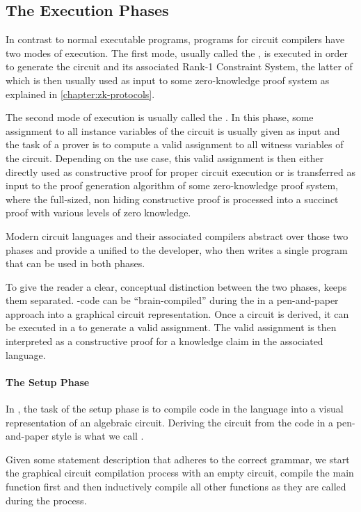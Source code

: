 \subsection{The Execution Phases} In contrast to normal executable programs, programs for circuit compilers have two modes of execution. The first mode, usually called the  , is executed in order to generate the circuit and its associated Rank-1 Constraint System, the latter of which is then usually used as input to some zero-knowledge proof system as explained in \ref{chapter:zk-protocols}.

The second mode of execution is usually called the . In this phase, some assignment to all instance variables of the circuit is usually given as input and the task of a prover is to compute a valid assignment to all witness variables of the circuit. Depending on the use case, this valid assignment is then either directly used as constructive proof for proper circuit execution or is transferred as input to the proof generation algorithm of some zero-knowledge proof system, where the full-sized, non hiding constructive proof is processed into a succinct proof with various levels of zero knowledge.

Modern circuit languages and their associated compilers abstract over those two phases and provide a unified  to the developer, who then writes a single program that can be used in both phases.

To give the reader a clear, conceptual distinction between the two phases,  keeps them separated. -code can be ``brain-compiled'' during the  in a pen-and-paper approach into a graphical circuit representation. Once a circuit is derived, it can be executed in a  to generate a valid assignment. The valid assignment is then interpreted as a constructive proof for a knowledge claim in the associated language.
\paragraph{The Setup Phase} In , the task of the setup phase is to compile code in the  language into a visual representation of an algebraic circuit. Deriving the circuit from the code in a pen-and-paper style is what we call .

Given some statement description that adheres to the correct grammar, we start the graphical circuit compilation process with an empty circuit, compile the main function first and then inductively compile all other functions as they are called during the process. 

